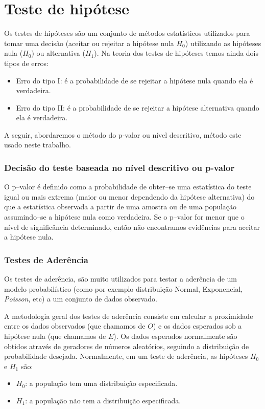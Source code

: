 \documentclass[
	12pt,
	openright,			%
	twoside,			%
	a4paper,			%
	chapter=TITLE,		%
	section=TITLE,		%
	subsection=TITLE,	%
	subsubsection=TITLE,%
	english,			%
	french,				%
	spanish,			%
	brazil				%
	]{abntex2}
\begin{document}
\section{Teste de hipótese}
Os testes de hipóteses são um conjunto de métodos estatísticos utilizados para tomar uma decisão (aceitar ou rejeitar a hipótese nula $H_0$) utilizando as hipóteses nula ($H_0$) ou alternativa ($H_1$).
Na teoria dos testes de hipóteses temos ainda dois tipos de erros:
\begin{itemize}
    \item Erro do tipo I: é a probabilidade de se rejeitar a hipótese nula quando ela é verdadeira.
    \item Erro do tipo II: é a probabilidade de se rejeitar a hipótese alternativa quando ela é verdadeira.
\end{itemize}

A seguir, abordaremos o método do p-valor ou nível descritivo, método este usado neste trabalho.

\subsubsection{Decisão do teste baseada no nível descritivo ou p-valor}
O p–valor é definido como a probabilidade de obter–se uma estatística do teste igual ou mais extrema (maior ou menor dependendo da hipótese alternativa) do que a estatística observada a partir de uma amostra ou de uma população assumindo–se a hipótese nula como verdadeira.
Se o p–valor for menor que o nível de significância determinado, então não encontramos evidências para aceitar a hipótese nula.

\subsubsection{Testes de Aderência}
Os testes de aderência, são muito utilizados para testar a aderência de um modelo probabilístico (como por exemplo distribuição Normal, Exponencial, \textit{Poisson}, etc) a um conjunto de dados observado.

A metodologia geral dos testes de aderência consiste em calcular a proximidade entre os dados observados (que chamamos de $O$) e os dados esperados sob a hipótese nula (que chamamos de $E$). Os dados esperados normalmente são obtidos através de geradores de números aleatórios, seguindo a distribuição de probabilidade desejada. Normalmente, em um teste de aderência, as hipóteses $H_0$ e $H_1$ são:
\begin{itemize}
    \item $H_0$: a população tem uma distribuição especificada.
    \item $H_1$: a população não tem a distribuição especificada.
\end{itemize}
\end{document}
